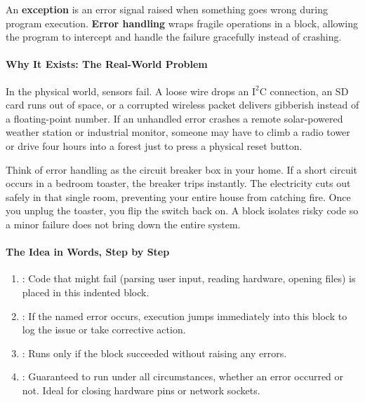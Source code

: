 \begin{keyidea}
An \textbf{exception} is an error signal raised when something goes wrong during program execution. \textbf{Error handling} wraps fragile operations in a  block, allowing the program to intercept and handle the failure gracefully instead of crashing.
\end{keyidea}

\paragraph{Why It Exists: The Real-World Problem}
In the physical world, sensors fail. A loose wire drops an $\text{I}^2\text{C}$ connection, an SD card runs out of space, or a corrupted wireless packet delivers gibberish instead of a floating-point number. If an unhandled error crashes a remote solar-powered weather station or industrial monitor, someone may have to climb a radio tower or drive four hours into a forest just to press a physical reset button.

\begin{analogy}
Think of error handling as the circuit breaker box in your home. If a short circuit occurs in a bedroom toaster, the breaker trips instantly. The electricity cuts out safely in that single room, preventing your entire house from catching fire. Once you unplug the toaster, you flip the switch back on. A  block isolates risky code so a minor failure does not bring down the entire system.
\end{analogy}

\paragraph{The Idea in Words, Step by Step}
\begin{enumerate}
    \item {}: Code that might fail (parsing user input, reading hardware, opening files) is placed in this indented block.
    \item {}: If the named error occurs, execution jumps immediately into this block to log the issue or take corrective action.
    \item {}: Runs only if the  block succeeded without raising any errors.
    \item {}: Guaranteed to run under all circumstances, whether an error occurred or not. Ideal for closing hardware pins or network sockets.
\end{enumerate}

